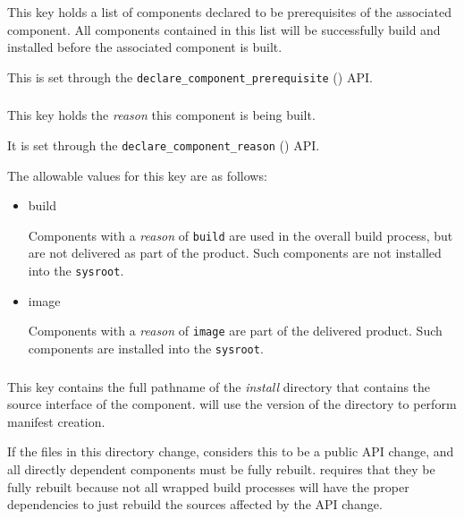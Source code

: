 This key holds a list of components declared to be prerequisites of
the associated component.  All components contained in this list will
be successfully build and installed before the associated component is
built.

This is set through the \texttt{declare\_component\_prerequisite}
() API.

\subsubsection{}

This key holds the \emph{reason} this component is being built.

It is set through the \texttt{declare\_component\_reason}
() API.

The allowable values for this key are as follows:

\begin{itemize}
\item build

  Components with a \emph{reason} of \texttt{build} are used in the
  overall build process, but are not delivered as part of the product.
  Such components are not installed into the \texttt{sysroot}.

\item image

  Components with a \emph{reason} of \texttt{image} are part of the
  delivered product.  Such components are installed into the
  \texttt{sysroot}.

\end{itemize}
\subsubsection{}\label{lmsbwcomponent:souce-api}

This key contains the full pathname of the \emph{install} directory
that contains the source interface of the component.  \lmsbw will use
the \destdir version of the directory to perform \mtree manifest
creation.

If the files in this directory change, \lmsbw considers this to be a
public API change, and all directly dependent components must be fully
rebuilt.  \lmsbw requires that they be fully rebuilt because not all
wrapped build processes will have the proper dependencies to just
rebuild the sources affected by the API change.


